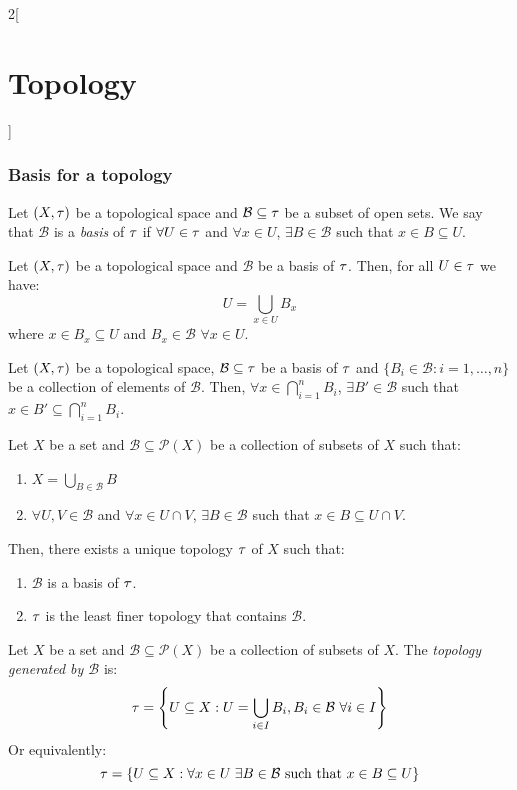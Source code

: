 \documentclass[../../../main.tex]{subfiles}
\begin{document}
\begin{multicols}{2}[\section{Topology}]
    \subsubsection{Basis for a topology}
    \begin{definition}
        Let $(X,\tau)$ be a topological space and $\mathcal{B}\subseteq\tau$ be a subset of open sets. We say that $\mathcal{B}$ is a \emph{basis} of $\tau$ if $\forall U\in\tau$ and $\forall x\in U$, $\exists B\in\mathcal{B}$ such that $x\in B\subseteq U$.
    \end{definition}
    \begin{prop}
        Let $(X,\tau)$ be a topological space and $\mathcal{B}$ be a basis of $\tau$. Then, for all $U\in\tau$ we have: $$U=\bigcup_{x\in U}B_x$$ where $x\in B_x\subseteq U$ and $B_x\in\mathcal{B}$ $\forall x\in U$.
    \end{prop}
    \begin{lemma}
        Let $(X,\tau)$ be a topological space, $\mathcal{B}\subseteq\tau$ be a basis of $\tau$ and $\{B_i\in\mathcal{B}:i=1,\ldots,n\}$ be a collection of elements of $\mathcal{B}$. Then, $\forall x\in\bigcap_{i=1}^nB_i$, $\exists B'\in\mathcal{B}$ such that $x\in B'\subseteq\bigcap_{i=1}^nB_i$.
    \end{lemma}
    \begin{prop}
        Let $X$ be a set and $\mathcal{B}\subseteq\mathcal{P}(X)$ be a collection of subsets of $X$ such that:
        \begin{enumerate}
            \renewcommand{\labelenumi}{\alph{enumi})}
            \item $\displaystyle X=\bigcup_{B\in\mathcal{B}} B$
            \item $\forall U,V\in\mathcal{B}$ and  $\forall x\in U\cap V$, $\exists B\in\mathcal{B}$ such that $x\in B\subseteq U\cap V$.
        \end{enumerate}
        Then, there exists a unique topology $\tau$ of $X$ such that:
        \begin{enumerate}
            \item $\mathcal{B}$ is a basis of $\tau$.
            \item $\tau$ is the least finer topology that contains $\mathcal{B}$.
        \end{enumerate}
    \end{prop}
    \begin{definition}
        Let $X$ be a set and $\mathcal{B}\subseteq\mathcal{P}(X)$ be a collection of subsets of $X$. The \emph{topology generated by $\mathcal{B}$} is: $$\tau=\left\{U\subseteq X:U=\bigcup_{i\in I}B_i, B_i\in \mathcal{B}\ \forall i\in I\right\}$$ Or equivalently: $$\tau=\left\{U\subseteq X:\forall x\in U\;\exists B\in\mathcal{B}\text{ such that }x\in B\subseteq U\right\}$$

\end{definition}
\end{multicols}
\end{document}
